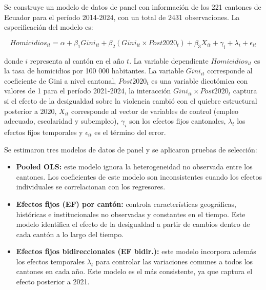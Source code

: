 \documentclass[12pt,a4paper]{article}
\begin{document}
Se construye un modelo de datos de panel con información de los 221 cantones de Ecuador para el período 2014-2024, con un total de 2431 observaciones. La especificación del modelo es:

\begin{equation}
Homicidios_{it} = \alpha + \beta_1 Gini_{it} + \beta_2 (Gini_{it} \times Post2020_t) + \beta_3 X_{it} + \gamma_i + \lambda_t + \epsilon_{it}
\end{equation}

donde \(i\) representa al cantón en el año \(t\). La variable dependiente \(Homicidios_{it}\) es la tasa de homicidios por 100 000 habitantes. La variable \(Gini_{it}\) corresponde al coeficiente de Gini a nivel cantonal, \(Post2020_t\) es una variable dicotómica con valores de 1 para el período 2021-2024, la interacción \(Gini_{it} \times Post2020_t\) captura si el efecto de la desigualdad sobre la violencia cambió con el quiebre estructural posterior a 2020, \(X_{it}\) corresponde al vector de variables de control (empleo adecuado, escolaridad y subempleo), \(\gamma_i\) son los efectos fijos cantonales, \(\lambda_t\) los efectos fijos temporales y \(\epsilon_{it}\) es el término del error.

Se estimaron tres modelos de datos de panel y se aplicaron pruebas de selección:

\begin{itemize}[leftmargin=1.25cm]
\item \textbf{Pooled OLS:} este modelo ignora la heterogeneidad no observada entre los cantones. Los coeficientes de este modelo son inconsistentes cuando los efectos individuales se correlacionan con los regresores.

\item \textbf{Efectos fijos (EF) por cantón:} controla características geográficas, históricas e institucionales no observadas y constantes en el tiempo. Este modelo identifica el efecto de la desigualdad a partir de cambios dentro de cada cantón a lo largo del tiempo.

\item \textbf{Efectos fijos bidireccionales (EF bidir.):} este modelo incorpora además los efectos temporales \(\lambda_t\) para controlar las variaciones comunes a todos los cantones en cada año. Este modelo es el más consistente, ya que captura el efecto posterior a 2021.
\end{itemize}
\end{document}
